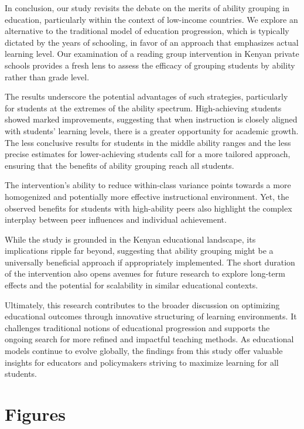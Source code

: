 \documentclass[12pt]{article}
\begin{document}
In conclusion, our study revisits the debate on the merits of ability grouping in education, particularly within the context of low-income countries. We explore an alternative to the traditional model of education progression, which is typically dictated by the years of schooling, in favor of an approach that emphasizes actual learning level. Our examination of a reading group intervention in Kenyan private schools provides a fresh lens to assess the efficacy of grouping students by ability rather than grade level.

The results underscore the potential advantages of such strategies, particularly for students at the extremes of the ability spectrum. High-achieving students showed marked improvements, suggesting that when instruction is closely aligned with students' learning levels, there is a greater opportunity for academic growth. The less conclusive results for students in the middle ability ranges and the less precise estimates for lower-achieving students call for a more tailored approach, ensuring that the benefits of ability grouping reach all students.

The intervention's ability to reduce within-class variance points towards a more homogenized and potentially more effective instructional environment. Yet, the observed benefits for students with high-ability peers also highlight the complex interplay between peer influences and individual achievement.

While the study is grounded in the Kenyan educational landscape, its implications ripple far beyond, suggesting that ability grouping might be a universally beneficial approach if appropriately implemented. The short duration of the intervention also opens avenues for future research to explore long-term effects and the potential for scalability in similar educational contexts.

Ultimately, this research contributes to the broader discussion on optimizing educational outcomes through innovative structuring of learning environments. It challenges traditional notions of educational progression and supports the ongoing search for more refined and impactful teaching methods. As educational models continue to evolve globally, the findings from this study offer valuable insights for educators and policymakers striving to maximize learning for all students.

\clearpage
\singlespacing

\doublespacing

\section*{Figures}
\end{document}
